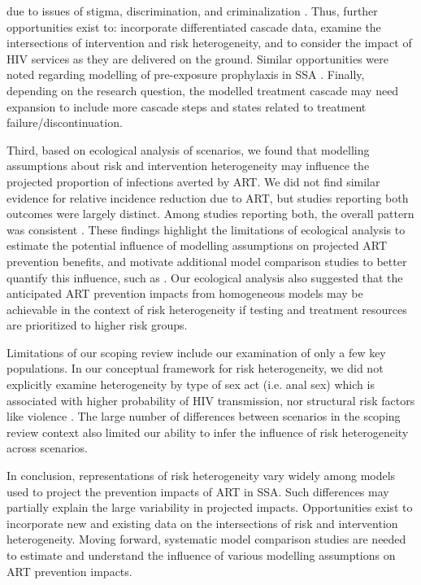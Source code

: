 due to issues of stigma, discrimination, and criminalization \cite{Ortblad2019,Baral2019}.
Thus, further opportunities exist to: incorporate differentiated cascade data,
examine the intersections of intervention and risk heterogeneity, and
to consider the impact of HIV services as they are delivered on the ground.
Similar opportunities were noted regarding modelling of pre-exposure prophylaxis in SSA \cite{Case2019}.
Finally, depending on the research question, the modelled treatment cascade may need expansion
to include more cascade steps and states related to treatment failure/discontinuation.
\par
Third, based on ecological analysis of scenarios, we found that
modelling assumptions about risk and intervention heterogeneity
may influence the projected proportion of infections averted by ART.
We did not find similar evidence for relative incidence reduction due to ART,
but studies reporting both outcomes were largely distinct.
Among studies reporting both, the overall pattern was consistent
\cite{Salomon2005,Abbas2006,Pretorius2010,Nichols2014,Barnighausen2016,Maheu-Giroux2017,Akudibillah2018}.
These findings highlight the limitations of ecological analysis to estimate
the potential influence of modelling assumptions on projected ART prevention benefits,
and motivate additional model comparison studies to better quantify this influence,
such as \cite{Dodd2010,Hontelez2013}.
Our ecological analysis also suggested that the anticipated ART prevention impacts from homogeneous models
may be achievable in the context of risk heterogeneity
if testing and treatment resources are prioritized to higher risk groups.
\par
Limitations of our scoping review include our examination of only a few key populations.
In our conceptual framework for risk heterogeneity, we did not explicitly examine heterogeneity
by type of sex act (i.e. anal sex) which is associated with higher probability of HIV transmission,
nor structural risk factors like violence \cite{Silverman2011,Baggaley2013}.
The large number of differences between scenarios in the scoping review context
also limited our ability to infer the influence of risk heterogeneity across scenarios.
\par
In conclusion, representations of risk heterogeneity vary widely
among models used to project the prevention impacts of ART in SSA.
Such differences may partially explain the large variability in projected impacts.
Opportunities exist to incorporate new and existing data on
the intersections of risk and intervention heterogeneity.
Moving forward, systematic model comparison studies are needed to
estimate and understand the influence of various modelling assumptions on ART prevention impacts.
